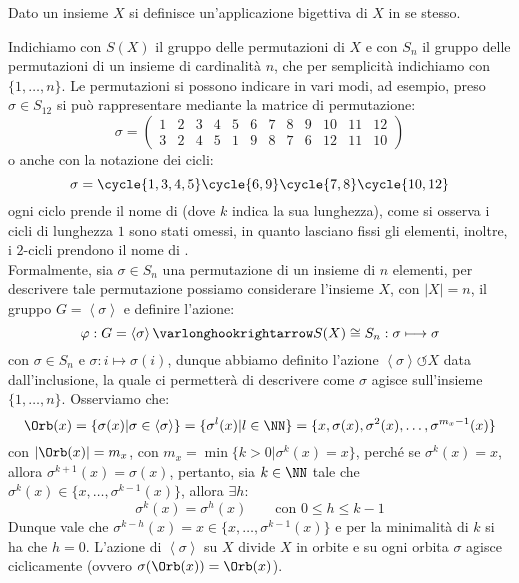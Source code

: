 \documentclass[11pt]{scrartcl}
\begin{document}
\begin{definition}
    Dato un insieme $X$ si definisce  un'applicazione bigettiva di $X$ in se stesso.
\end{definition}

Indichiamo con $S(X)$ il gruppo delle permutazioni di $X$ e con $S_n$ il gruppo delle permutazioni di un insieme di cardinalità $n$, che 
per semplicità indichiamo con $\{1,\ldots,n\}$.
Le permutazioni si possono indicare in vari modi, ad esempio, preso $\sigma \in S_{12}$ si può rappresentare mediante la matrice di permutazione:
    \[ \sigma = \left(\begin{array}{cccccccccccc}
        1 & 2 & 3 & 4 & 5 & 6 & 7 & 8 & 9 & 10 & 11 & 12 \\
        3 & 2 & 4 & 5 & 1 & 9 & 8 & 7 & 6 & 12 & 11 & 10 
        \end{array}\right)
        \]
o anche con la notazione dei cicli:
    \[ \sigma = \cycle{1,3,4,5} \cycle{6,9} \cycle{7,8} \cycle{10,12}
            \]
ogni ciclo prende il nome di  (dove $k$ indica la sua lunghezza), come si osserva i cicli di lunghezza $1$ sono stati omessi,
in quanto lasciano fissi gli elementi, inoltre, i $2$-cicli prendono il nome di .\\
Formalmente, sia $\sigma \in S_n$ una permutazione di un insieme di $n$ elementi, per descrivere tale permutazione
 possiamo considerare l'insieme $X$, con $|X| = n$, il gruppo $G = \left<\sigma\right>$ e definire l'azione:
    \[ \varphi : G = \left<\sigma\right> \varlonghookrightarrow S(X) \cong S_n : \sigma \longmapsto \sigma
        \]
con $\sigma \in S_n$ e $\sigma : i \longmapsto \sigma(i)$, dunque abbiamo definito l'azione $\left<\sigma\right> \circlearrowleft X$ data dall'inclusione, la quale ci permetterà di descrivere come
$\sigma$ agisce sull'insieme $\{1,\ldots,n\}$. Osserviamo che:
    \[ \Orb(x) = \{\sigma(x) | \sigma \in \left<\sigma\right>\} = \{\sigma^l(x) | l \in \NN\} = \{x, \sigma(x), \sigma^2(x),\ldots,\sigma^{m_x-1}(x)\}
        \]
con $|\Orb(x)| = m_x$, con $m_x = \min\{k > 0 | \sigma^k(x) = x\}$, perché se $\sigma^k(x) = x$, allora $\sigma^{k+1}(x) = \sigma(x)$, pertanto, sia $k \in \NN$
tale che $\sigma^k(x) \in \{x,\ldots,\sigma^{k-1}(x)\}$, allora $\exists h:$
    \[ \sigma^k(x) = \sigma^h(x)
    \qquad \text{con $0 \leq h \leq k-1$}
        \]
Dunque vale che $\sigma^{k-h}(x) = x \in \{x,\ldots,\sigma^{k-1}(x)\}$ e per la minimalità di $k$ si ha che $h = 0$.
L'azione di $\left<\sigma\right>$ su $X$ divide $X$ in orbite e su ogni orbita $\sigma$ agisce ciclicamente (ovvero $\sigma(\Orb(x)) = \Orb(x)$).
\end{document}
